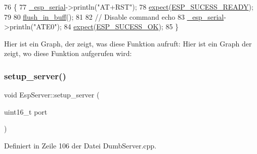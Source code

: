 \begin{DoxyCode}
76 \{
77   \hyperlink{class_esp_server_a33166aa92db341d47cdf1776492cca62}{\_esp\_serial}->println(\textcolor{stringliteral}{"AT+RST"});
78   \hyperlink{class_esp_server_a2008f0d315cff00a4bcc1120eeb2dc95}{expect}(\hyperlink{_dumb_server_8cpp_af9850325c242ec48a5d70923c6147de5}{ESP\_SUCESS\_READY});
79 
80   \hyperlink{class_esp_server_a191aa3259094cf1d2c0f22cdfbca9f58}{flush\_in\_buff}();
81 
82   \textcolor{comment}{// Disable command echo}
83   \hyperlink{class_esp_server_a33166aa92db341d47cdf1776492cca62}{\_esp\_serial}->println(\textcolor{stringliteral}{"ATE0"});
84   \hyperlink{class_esp_server_a2008f0d315cff00a4bcc1120eeb2dc95}{expect}(\hyperlink{_dumb_server_8cpp_a62497fcb12b1cedd5fdfbc0755508d87}{ESP\_SUCESS\_OK});
85 \}
\end{DoxyCode}
Hier ist ein Graph, der zeigt, was diese Funktion aufruft\+:
Hier ist ein Graph der zeigt, wo diese Funktion aufgerufen wird\+:
\mbox{\label{class_esp_server_a215752989c25b9819ca06bc8f94845ed}} 
\subsubsection{\texorpdfstring{setup\+\_\+server()}{setup\_server()}}
{\footnotesize\ttfamily void Esp\+Server\+::setup\+\_\+server (\begin{DoxyParamCaption}\item[{uint16\+\_\+t}]{port }\end{DoxyParamCaption})\hspace{0.3cm}{\ttfamily [private]}}



Definiert in Zeile 106 der Datei Dumb\+Server.\+cpp.


